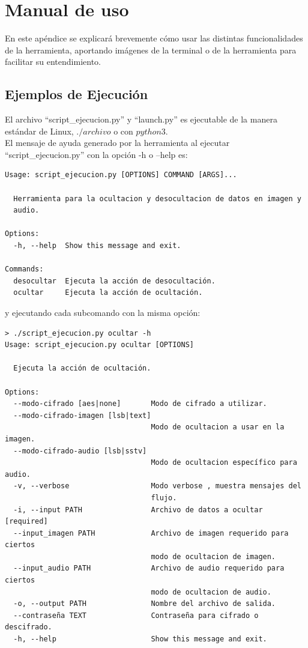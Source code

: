 
\chapter{Manual de uso}
\label{Appendix:Key2}

En este apéndice se explicará brevemente cómo usar las distintas funcionalidades de la herramienta, aportando imágenes de la terminal o de la herramienta para facilitar su entendimiento.

\section{Ejemplos de Ejecución}

El archivo ``script\_ejecucion.py'' y ``launch.py'' es ejecutable de la manera estándar de Linux, $./archivo$ o con $python3$.\\

El mensaje de ayuda generado por la herramienta al ejecutar ``script\_ejecucion.py'' con la opción -h o --help es:


\begin{verbatim}
Usage: script_ejecucion.py [OPTIONS] COMMAND [ARGS]...

  Herramienta para la ocultacion y desocultacion de datos en imagen y
  audio.

Options:
  -h, --help  Show this message and exit.

Commands:
  desocultar  Ejecuta la acción de desocultación.
  ocultar     Ejecuta la acción de ocultación.
\end{verbatim}

y ejecutando cada subcomando con la misma opción:

\begin{verbatim}
> ./script_ejecucion.py ocultar -h
Usage: script_ejecucion.py ocultar [OPTIONS]

  Ejecuta la acción de ocultación.

Options:
  --modo-cifrado [aes|none]       Modo de cifrado a utilizar.
  --modo-cifrado-imagen [lsb|text]
                                  Modo de ocultacion a usar en la imagen.
  --modo-cifrado-audio [lsb|sstv]
                                  Modo de ocultacion específico para audio.
  -v, --verbose                   Modo verbose , muestra mensajes del
                                  flujo.
  -i, --input PATH                Archivo de datos a ocultar  [required]
  --input_imagen PATH             Archivo de imagen requerido para ciertos
                                  modo de ocultacion de imagen.
  --input_audio PATH              Archivo de audio requerido para ciertos
                                  modo de ocultacion de audio.
  -o, --output PATH               Nombre del archivo de salida.
  --contraseña TEXT               Contraseña para cifrado o descifrado.
  -h, --help                      Show this message and exit.
\end{verbatim}

